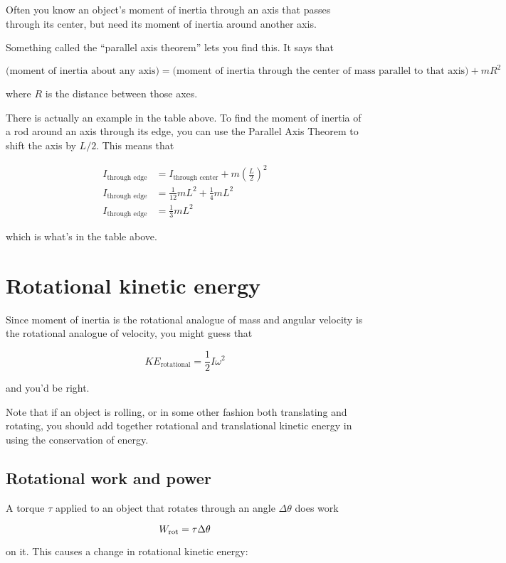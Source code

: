 \documentclass[10pt]{article}
\begin{document}
Often you know an object's moment of inertia through an axis that passes through its center, but need its moment of inertia around another axis.

Something called the ``parallel axis theorem'' lets you find this. It says that

$$\text{(moment of inertia about any axis)} = \text{(moment of inertia through the center of mass parallel to that axis)} + mR^2$$

where $R$ is the distance between those axes.

There is actually an example in the table above. To find the moment of inertia of a rod around an axis through its edge, you can use the Parallel Axis Theorem to shift the axis by $L/2$. This means that 

\begin{align*}
I_{\text {through edge}} &= I_{\text{through center}} + m\left(\frac{L}{2}\right)^2\\
I_{\text {through edge}} &= \frac{1}{12}mL^2 + \frac{1}{4}mL^2 \\
I_{\text {through edge}} &= \frac{1}{3}mL^2
\end{align*}

which is what's in the table above.

\section{Rotational kinetic energy}

Since moment of inertia is the rotational analogue of mass and angular velocity is the rotational analogue of velocity, you might guess that 

$$KE_{\text{rotational}} = \frac{1}{2}I \omega^2$$

and you'd be right.

Note that if an object is rolling, or in some other fashion both translating and rotating, you should add together rotational and translational kinetic energy in using the conservation of energy.

\subsection{Rotational work and power}

A torque $\tau$ applied to an object that rotates through an angle $\Delta \theta$ does work 

$$W_{\rm rot} = \tau \Delta \theta$$

on it. This causes a change in rotational kinetic energy:
\end{document}
